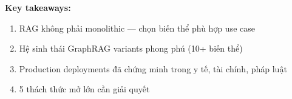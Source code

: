 \documentclass[conference]{IEEEtran}
\begin{document}
\textbf{Key takeaways:}
\begin{enumerate}
    \item RAG không phải monolithic --- chọn biến thể phù hợp use case
    \item Hệ sinh thái GraphRAG variants phong phú (10+ biến thể)
    \item Production deployments đã chứng minh trong y tế, tài chính, pháp luật
    \item 5 thách thức mở lớn cần giải quyết
\end{enumerate}



\end{document}
